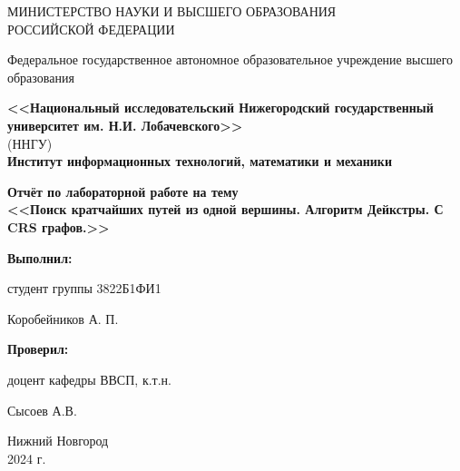 \documentclass[12pt]{article}
\begin{document}
\begin{titlepage}
	\begin{center}
		\large
		{МИНИСТЕРСТВО НАУКИ И ВЫСШЕГО ОБРАЗОВАНИЯ\\ РОССИЙСКОЙ ФЕДЕРАЦИИ}
		
		Федеральное государственное автономное образовательное учреждение высшего образования
		\vspace{0.5cm}
		
		\textbf{<<Национальный исследовательский Нижегородский государственный университет им. Н.И. Лобачевского>>}\\
		(ННГУ)\\
		\vspace{1cm}
		\textbf{Институт информационных технологий, математики и механики}\\
		\vspace{1cm}
		
		
		\vfill
		
		\vfill
		
		\Large
		\textbf{Отчёт по лабораторной работе на тему} \\
		\textbf{<<Поиск кратчайших путей из одной вершины. Алгоритм Дейкстры. С CRS графов.>>}
		{\LARGE 
		}
		\bigskip
		
		
	\end{center}
	\vfill
	
	\hfill\begin{minipage}{0.4\textwidth}
		\textbf{Выполнил:} 

            студент группы 3822Б1ФИ1

            \underline{\hspace{3cm}} Коробейников А. П. \bigskip
            
	\end{minipage}%
	
	\hfill\begin{minipage}{0.4\textwidth}
		\textbf{Проверил:}

           доцент кафедры ВВСП, к.т.н.
           
           \underline{\hspace{3cm}} Сысоев А.В.\bigskip
	\end{minipage}%
	\vfill
	
	\begin{center}
		Нижний Новгород\\
		2024 г.
	\end{center}
\end{titlepage}
\thispagestyle{empty} %
\tableofcontents
\end{document}
